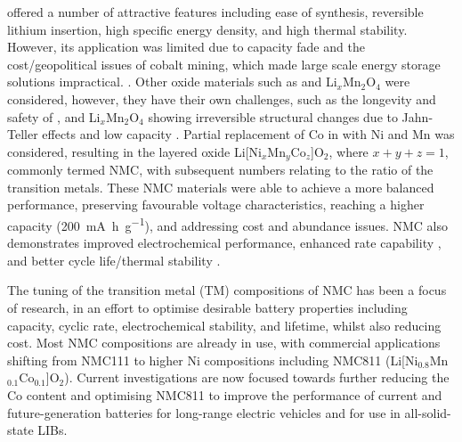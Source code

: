 \documentclass[journal=jacsat,manuscript=article]{achemso}
\begin{document}
 offered a number of attractive features including ease of synthesis, reversible lithium insertion, high specific energy density, and high thermal stability.\cite{gibbard1989high,plichta1989improved} 
However, its application was limited due to capacity fade and the cost/geopolitical issues of cobalt mining, which made large scale energy storage solutions impractical. \cite{mo_impact_2018,Banza2009}. 
Other oxide materials such as  and Li$_x$Mn$_2$O$_4$ were considered, however, they have their own challenges, such as the longevity and safety of , \cite{min_comparative_2016} and Li$_x$Mn$_2$O$_4$ showing irreversible structural changes due to Jahn-Teller effects and low capacity \cite{tian_performance_2018}. Partial replacement of Co in  with Ni and Mn was considered, resulting in the layered oxide Li[Ni$_x$Mn$_y$Co$_z$]O$_2$, where $x+y+z=1$, commonly termed NMC, with subsequent numbers relating to the ratio of the transition metals.\cite{paulsen2000o2,paulsen20002, lu2001layered,rozier2015li} 
These NMC materials were able to achieve a more balanced performance, preserving favourable voltage characteristics, reaching a higher capacity (\SI{200}{mA.h.g^{-1}}), and addressing cost and abundance issues. \cite{sun_electronic_2017,larcher2015towards,ohzuku2001layered} 
NMC also demonstrates improved electrochemical performance, enhanced rate capability \cite{noh2013comparison,dahn1991rechargeable}, and better cycle life/thermal stability \cite{kim2006synthesis,armstrong1996synthesis}.

The tuning of the transition metal (TM) compositions of NMC has been a focus of research, in an effort to optimise desirable battery properties including capacity, cyclic rate, electrochemical stability, and lifetime, whilst also reducing cost. \cite{duan2019insights} Most NMC compositions are already in use, with commercial applications shifting from NMC111 to higher Ni compositions including NMC811 (Li[Ni$_{0.8}$Mn$_{0.1}$Co$_{0.1}$]O$_2$). \cite{zhang2018structural} 
Current investigations are now focused towards further reducing the Co content and optimising NMC811 to improve the performance of current and future-generation batteries for long-range electric vehicles \cite{azevedo2018mining} and for use in all-solid-state LIBs. \cite{myung2017nickel,ohzuku_layered_2001, lu2001layered,belharouak2003li,kim2014unexpected,sun_electronic_2017}
\end{document}
